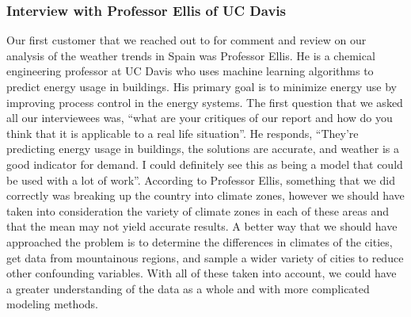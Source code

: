 \documentclass[10pt]{article}
\begin{document}
\subsubsection*{Interview with Professor Ellis of UC Davis}
Our first customer that we reached out to for comment and review on our analysis of the weather trends in Spain was Professor Ellis. He is a chemical engineering professor at UC Davis who uses machine learning algorithms to predict energy usage in buildings. His primary goal is to minimize energy use by improving process control in the energy systems. The first question that we asked all our interviewees was, “what are your critiques of our report and how do you think that it is applicable to a real life situation”. He responds, “They’re predicting energy usage in buildings, the solutions are accurate, and weather is a good indicator for demand. I could definitely see this as being a model that could be used with a lot of work”. According to Professor Ellis, something that we did correctly was breaking up the country into climate zones, however we should have taken into consideration the variety of climate zones in each of these areas and that the mean may not yield accurate results. A better way that we should have approached the problem is to determine the differences in climates of the cities, get data from mountainous regions, and sample a wider variety of cities to reduce other confounding variables. With all of these taken into account, we could have a greater understanding of the data as a whole and with more complicated modeling methods.
\end{document}
